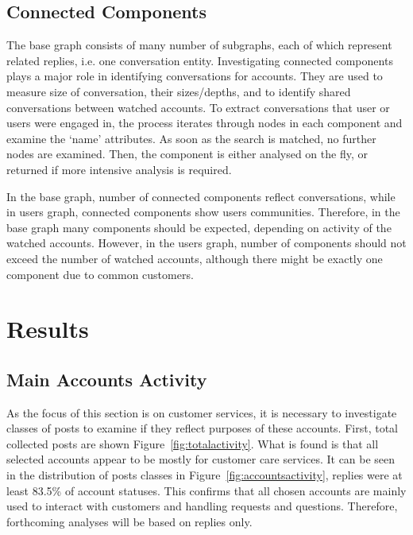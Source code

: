 \documentclass[sigconf]{acmart}
\begin{document}
\subsection{Connected Components}

The base graph consists of many number of subgraphs, each of which
represent related replies, i.e. one conversation entity. Investigating
connected components plays a major role in identifying conversations
for accounts. They are used to measure size of conversation, their
sizes/depths, and to identify shared conversations between watched
accounts. To extract conversations that user or users were engaged in,
the process iterates through nodes in each component and examine the
`name' attributes. As soon as the search is matched, no further nodes
are examined. Then, the component is either analysed on the fly, or
returned if more intensive analysis is required.

In the base graph, number of connected components reflect
conversations, while in users graph, connected components show users
communities. Therefore, in the base graph many components should be
expected, depending on activity of the watched accounts. However, in
the users graph, number of components should not exceed the number of
watched accounts, although there might be exactly one component due to
common customers.


\section{Results}\label{results}

\subsection{Main Accounts Activity}

As the focus of this section is on customer services, it is necessary
to investigate classes of posts to examine if they reflect purposes of
these accounts. First, total collected posts are shown
Figure~\ref{fig:totalactivity}. What is found is that all selected
accounts appear to be mostly for customer care services. It can be
seen in the distribution of posts classes in
Figure~\ref{fig:accountsactivity}, replies were at least 83.5\% of
account statuses. This confirms that all chosen accounts are mainly
used to interact with customers and handling requests and
questions. Therefore, forthcoming analyses will be based on replies
only.
\end{document}
